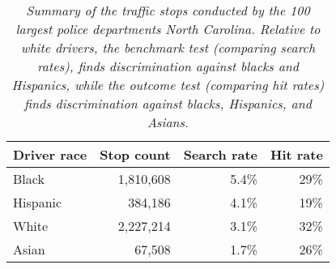\begin{table}[ht]
\centering
\begin{tabular}{lrrr}
  \toprule
Driver race & Stop count & Search rate & Hit rate \\ 
  \midrule
Black & 1,810,608 & 5.4\% & 29\% \\ 
  Hispanic & 384,186 & 4.1\% & 19\% \\ 
  White & 2,227,214 & 3.1\% & 32\% \\ 
  Asian & 67,508 & 1.7\% & 26\% \\ 
   \bottomrule
\end{tabular}
\caption{\emph{Summary of the traffic stops conducted by the 100 largest police departments North Carolina. Relative to white drivers, the benchmark test (comparing search rates), finds discrimination against blacks and Hispanics, while the outcome test (comparing hit rates) finds discrimination against blacks, Hispanics, and Asians.}} 
\label{tab:results}
\end{table}

